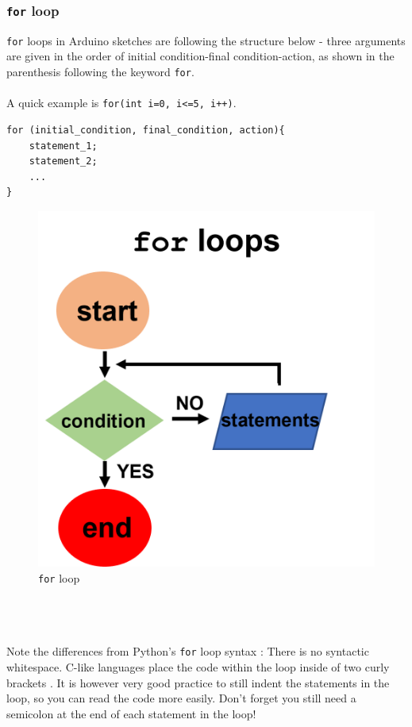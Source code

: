 \documentclass{article}
\begin{document}
\subsubsection{\texttt{for} loop}
\begin{minipage}{.6\textwidth}
\texttt{for} loops in Arduino sketches are following the structure below - three arguments are given in the order of initial condition-final condition-action, as shown in the parenthesis following the keyword \texttt{for}. \\\\A quick example is \texttt{for(int i=0, i<=5, i++)}.
\begin{lstlisting}[caption=for loop]
for (initial_condition, final_condition, action){
    statement_1;
    statement_2;
    ...
}
\end{lstlisting}
\end{minipage}\hfill
\begin{minipage}{.35\textwidth} 
\begin{figure}[H]\vspace{-1cm}
    \centering
    \includegraphics[width=.75\textwidth]{for_loop.png}
    \caption{\texttt{for} loop}
\end{figure}
\end{minipage}\\\\\\
\noindent Note the differences from Python's \texttt{for} loop syntax : There is no syntactic whitespace. C-like languages place the code within the loop inside of two curly brackets {}. It is however very good practice to still indent the statements in the loop, so you can read the code more easily. Don't forget you still need a semicolon at the end of each statement in the loop!
\end{document}
